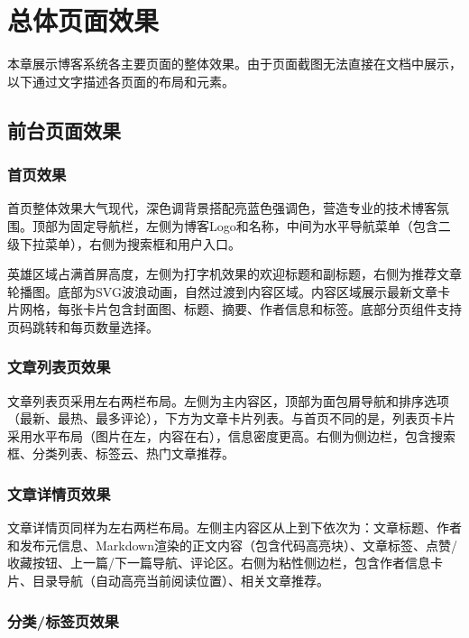 \documentclass[12pt,a4paper]{article}
\begin{document}
\section{总体页面效果}

本章展示博客系统各主要页面的整体效果。由于页面截图无法直接在文档中展示，以下通过文字描述各页面的布局和元素。

\subsection{前台页面效果}

\subsubsection{首页效果}

首页整体效果大气现代，深色调背景搭配亮蓝色强调色，营造专业的技术博客氛围。顶部为固定导航栏，左侧为博客Logo和名称，中间为水平导航菜单（包含二级下拉菜单），右侧为搜索框和用户入口。

英雄区域占满首屏高度，左侧为打字机效果的欢迎标题和副标题，右侧为推荐文章轮播图。底部为SVG波浪动画，自然过渡到内容区域。内容区域展示最新文章卡片网格，每张卡片包含封面图、标题、摘要、作者信息和标签。底部分页组件支持页码跳转和每页数量选择。

\subsubsection{文章列表页效果}

文章列表页采用左右两栏布局。左侧为主内容区，顶部为面包屑导航和排序选项（最新、最热、最多评论），下方为文章卡片列表。与首页不同的是，列表页卡片采用水平布局（图片在左，内容在右），信息密度更高。右侧为侧边栏，包含搜索框、分类列表、标签云、热门文章推荐。

\subsubsection{文章详情页效果}

文章详情页同样为左右两栏布局。左侧主内容区从上到下依次为：文章标题、作者和发布元信息、Markdown渲染的正文内容（包含代码高亮块）、文章标签、点赞/收藏按钮、上一篇/下一篇导航、评论区。右侧为粘性侧边栏，包含作者信息卡片、目录导航（自动高亮当前阅读位置）、相关文章推荐。

\subsubsection{分类/标签页效果}
\end{document}
